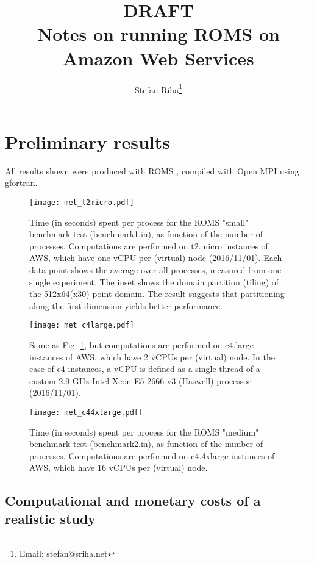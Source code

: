 \documentclass[12pt,a4paper]{article}
\title{
	{\bf DRAFT}\\
	Notes on running ROMS on Amazon Web Services 
}
\author{Stefan Riha\thanks{Email: stefan@sriha.net}}
\begin{document}
	\setlength{\parindent}{0cm}
	\maketitle

\section{Preliminary results}
	All results shown were produced with ROMS \citep{shchepetkin2005regional}, compiled with Open MPI using gfortran.
	
	\begin{figure}[H]
		\centering
		\texttt{[image: met\_t2micro.pdf]}
		\caption{Time (in seconds) spent per process for the ROMS "small" benchmark test (benchmark1.in), as function of the number of processes. Computations are performed on t2.micro instances of AWS, which have one vCPU per (virtual) node (2016/11/01). Each data point shows the average over all processes, measured from one single experiment. The inset shows the domain partition (tiling) of the 512x64(x30) point domain. The result suggests that partitioning along the first dimension yields better performance.}
		\label{fig:met_t2micro}
	\end{figure}

	\begin{figure}[H]
	\centering
	\texttt{[image: met\_c4large.pdf]}
	\caption{Same as Fig. \ref{fig:met_t2micro}, but computations are performed on c4.large instances of AWS, which have 2 vCPUs per (virtual) node. In the case of c4 instances, a vCPU is defined as a single thread of a custom 2.9 GHz Intel Xeon E5-2666 v3 (Haswell) processor (2016/11/01).}
	\label{fig:met_c4large}
\end{figure}

\begin{figure}[H]
	\centering
	\texttt{[image: met\_c44xlarge.pdf]}
	\caption{Time (in seconds) spent per process for the ROMS "medium" benchmark test (benchmark2.in), as function of the number of processes. Computations are performed on c4.4xlarge instances of AWS, which have 16 vCPUs per (virtual) node.}
	\label{fig:met_c44xlarge}
\end{figure}

\subsection{Computational and monetary costs of a realistic study}
\end{document}
